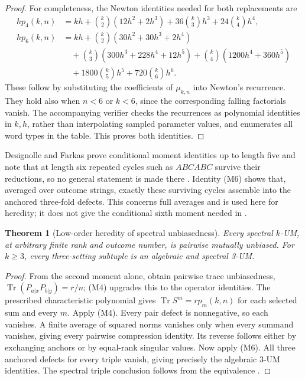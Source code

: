 \documentclass[11pt]{article}
\newtheorem{theorem}{Theorem}[section]
\begin{document}
\begin{proof}
For completeness, the Newton identities needed for both replacements are
\begin{align*}
 h p_4(k,n)&=kh+\binom{k}{2}(12h^2+2h^3)
                  +36\binom{k}{3}h^3+24\binom{k}{4}h^4,\\
 h p_6(k,n)&=kh+\binom{k}{2}(30h^2+30h^3+2h^4)\\
 &\quad+\binom{k}{3}(300h^3+228h^4+12h^5)
 +\binom{k}{4}(1200h^4+360h^5)\\
 &\quad+1800\binom{k}{5}h^5+720\binom{k}{6}h^6.
\end{align*}
These follow by substituting the coefficients of $\mu_{k,n}$ into
Newton's recurrence. They hold also when $n<6$ or $k<6$, since the
corresponding falling factorials vanish. The accompanying verifier
checks the recurrences as polynomial identities in $k,h$, rather than
interpolating sampled parameter values, and enumerates all word types
in the table. This proves both identities.
\end{proof}

Designolle and Farkas prove conditional moment identities up to length
five and note that at length six repeated cycles such as $ABCABC$ survive
their reductions, so no general statement is made there \cite[App.~E]{DF}.
Identity (M6) shows that, averaged over outcome strings, exactly these
surviving cycles assemble into the anchored three-fold defects. This
concerns full averages and is used here for heredity; it does not give
the conditional sixth moment needed in \cite[App.~E]{DF}.

\begin{theorem}[Low-order heredity of spectral unbiasedness]
\label{thm:spectralheredity}
Every spectral $k$-UM, at arbitrary finite rank and outcome number, is
pairwise mutually unbiased. For $k\geq3$, every three-setting subtuple
is an algebraic and spectral 3-UM.
\end{theorem}
\begin{proof}
From the second moment alone, \cite[Prop.~6]{DF} obtain pairwise trace
unbiasedness, $\operatorname{Tr}(P_{a|x}P_{b|y})=r/n$; (M4) upgrades this
to the operator identities.
The prescribed characteristic polynomial gives
$\operatorname{Tr}S^m=rp_m(k,n)$ for each selected sum and every $m$.
Apply (M4). Every pair defect is nonnegative, so each vanishes.
A finite average of squared norms vanishes only when every summand
vanishes, giving every pairwise compression identity. Its reverse
follows either by exchanging anchors or by equal-rank singular values.
Now apply (M6). All three anchored defects for every triple vanish,
giving precisely the algebraic 3-UM identities. The spectral triple
conclusion follows from the equivalence \cite[Thm.~3(5)]{DF}.
\end{proof}
\end{document}
